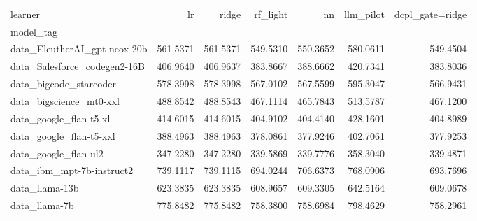 \begin{tabular}{lrrrrrr}
\toprule
learner & lr & ridge & rf\_light & nn & llm\_pilot & dcpl\_gate=ridge \\
model_tag &  &  &  &  &  &  \\
\midrule
data\_EleutherAI\_gpt-neox-20b & 561.5371 & 561.5371 & 549.5310 & 550.3652 & 580.0611 & 549.4504 \\
data\_Salesforce\_codegen2-16B & 406.9640 & 406.9637 & 383.8667 & 388.6662 & 420.7341 & 383.8036 \\
data\_bigcode\_starcoder & 578.3998 & 578.3998 & 567.0102 & 567.5599 & 595.3047 & 566.9431 \\
data\_bigscience\_mt0-xxl & 488.8542 & 488.8543 & 467.1114 & 465.7843 & 513.5787 & 467.1200 \\
data\_google\_flan-t5-xl & 414.6015 & 414.6015 & 404.9102 & 404.4140 & 428.1601 & 404.8989 \\
data\_google\_flan-t5-xxl & 388.4963 & 388.4963 & 378.0861 & 377.9246 & 402.7061 & 377.9253 \\
data\_google\_flan-ul2 & 347.2280 & 347.2280 & 339.5869 & 339.7776 & 358.3040 & 339.4871 \\
data\_ibm\_mpt-7b-instruct2 & 739.1117 & 739.1115 & 694.0244 & 706.6373 & 768.0906 & 693.7696 \\
data\_llama-13b & 623.3835 & 623.3835 & 608.9657 & 609.3305 & 642.5164 & 609.0678 \\
data\_llama-7b & 775.8482 & 775.8482 & 758.3800 & 758.6984 & 798.4629 & 758.2961 \\
\bottomrule
\end{tabular}
